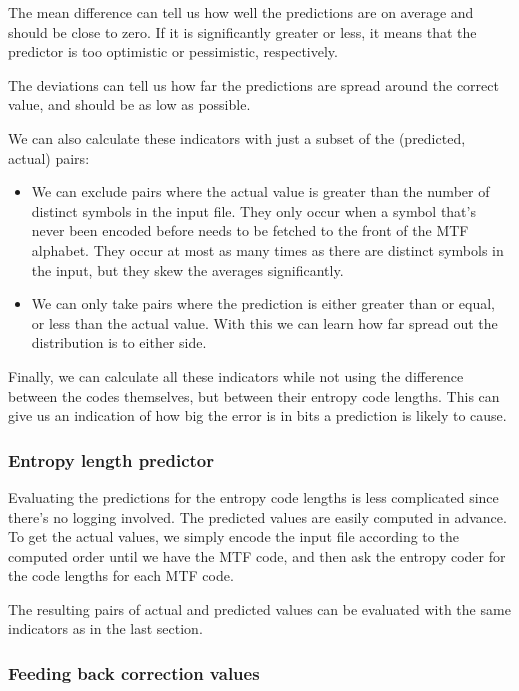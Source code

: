 \documentclass[a4paper]{scrreprt}
\begin{document}
The mean difference can tell us how well the predictions are on average and
should be close to zero. If it is significantly greater or less, it means that
the predictor is too optimistic or pessimistic, respectively.

The deviations can tell us how far the predictions are spread around the correct
value, and should be as low as possible.

We can also calculate these indicators with just a subset of the
(predicted, actual) pairs:
\begin{itemize}
  \item We can exclude pairs where the actual value is
  greater than the number of distinct symbols in the input file. They only occur
  when a symbol that's never been encoded before needs to be fetched to the
  front of the MTF alphabet. They occur at most as many times as there are
  distinct symbols in the input, but they skew the averages significantly.
  \item We can only take pairs where the prediction is either greater than or
  equal, or less than the actual value. With this we can learn how far spread
  out the distribution is to either side.
\end{itemize}

Finally, we can calculate all these indicators while not using the difference
between the codes themselves, but between their entropy code lengths. This can
give us an indication of how big the error is in bits a prediction is likely to
cause.

\subsubsection{Entropy length predictor}

Evaluating the predictions for the entropy code lengths is less complicated
since there's no logging involved. The predicted values are easily computed in
advance. To get the actual values, we simply encode the input file according to
the computed order until we have the MTF code, and then ask the entropy coder
for the code lengths for each MTF code.

The resulting pairs of actual and predicted values can be evaluated with the
same indicators as in the last section.


\subsubsection{Feeding back correction values}
\end{document}
